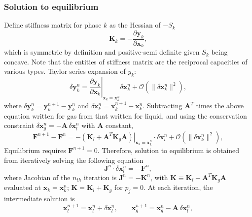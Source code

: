 \subsubsection{Solution to equilibrium}
Define stiffness matrix for phase $k$ as the Hessian of $-S_k$
\begin{equation}\label{stiffness}
\boldsymbol{K}_k = -\frac{ \partial \boldsymbol{y}_k } { \partial \boldsymbol{x}_k},
\end{equation}
which is symmetric by definition and positive-semi definite given $S_k$ being concave. Note that the entities of stiffness matrix are the reciprocal capacities of various types. Taylor series expansion of $y_k$:
\begin{equation}
\delta{\boldsymbol{y}}_k^{n} = \left. \frac{ \partial \boldsymbol{y}_k } { \partial \boldsymbol{x}_k}\right|_{\boldsymbol{x}_k=\boldsymbol{x}_k^n} \delta{\boldsymbol{x}}_k^{n} + \mathcal{O}\left(\lVert\delta{\boldsymbol{x}}_k^{n}\rVert ^2\right),
\end{equation}
where $\delta{\boldsymbol{y}}_k^{n} = \boldsymbol{y}_k^{n+1} - \boldsymbol{y}_k^{n}$ and $\delta{\boldsymbol{x}}_k^{n} = \boldsymbol{x}_k^{n+1} - \boldsymbol{x}_k^{n}$. Subtracting $\boldsymbol{A}^T$ times the above equation written for gas from that written for liquid, and using the conservation constraint $\delta\boldsymbol{x}_g^n=-\boldsymbol{A}\,\delta\boldsymbol{x}_l^n$ with $\boldsymbol{A}$ constant,
\begin{equation}\label{F_taylor}
\boldsymbol{F}^{n+1} - \boldsymbol{F}^{n} = - \left. \left(\boldsymbol{K}_l+\boldsymbol{A}^T\boldsymbol{K}_g\boldsymbol{A} \right)\right|_{\boldsymbol{x}_k=\boldsymbol{x}_k^n} \cdot \delta{\boldsymbol{x}}_l^{n} + \mathcal{O}\left(\lVert\delta{\boldsymbol{x}}_k^{n}\rVert ^2\right),
\end{equation}
Equilibrium requires $\boldsymbol{F}^{n+1} = 0$. Therefore, solution to equilibrium is obtained from iteratively solving the following equation
\begin{equation}\label{newton_x}
\boldsymbol{J}^n \cdot \delta{\boldsymbol{x}}_l^{n} = - \boldsymbol{F}^{n},
\end{equation}
where Jacobian of the $n_{th}$ iteration is $\boldsymbol{J}^n = -\boldsymbol{K}^n$, with $\boldsymbol{K}\equiv\boldsymbol{K}_l+\boldsymbol{A}^T\boldsymbol{K}_g\boldsymbol{A}$ evaluated at $\boldsymbol{x}_k=\boldsymbol{x}_k^n$; $\boldsymbol{K}=\boldsymbol{K}_l+\boldsymbol{K}_g$ for $p_{j}=0$. At each iteration, the intermediate solution is
\begin{equation}
\boldsymbol{x}_l^{n+1} = \boldsymbol{x}_l^{n} + \delta{\boldsymbol{x}}_l^{n},\qquad \boldsymbol{x}_g^{n+1} = \boldsymbol{x}_g^{n} - \boldsymbol{A}\,\delta{\boldsymbol{x}}_l^{n},
\end{equation}

